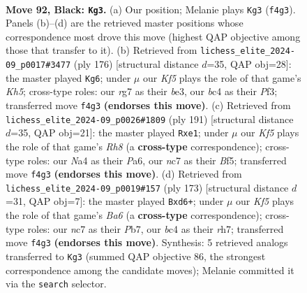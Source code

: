 \documentclass[11pt]{article}
\begin{document}
\clearpage

\begin{figure}[p]\centering
\begin{subfigure}{0.46\textwidth}\centering
\resizebox{\linewidth}{!}{%
\newchessgame
\chessboard[
  setfen={8/2N3R1/8/5P2/npB1bkP1/8/8/5K2 b - - 7 92},
  showmover=false,
  pgfstyle=straightmove, color=movearrow, markmove={f4-g3}
]}
\caption{}
\end{subfigure}\hfill
\begin{subfigure}{0.46\textwidth}\centering
\resizebox{\linewidth}{!}{%
\newchessgame
\chessboard[
  setfen={2B5/8/3kp2p/5p1K/8/4bP2/8/8 w - - 3 89},
  showmover=false,
  pgfstyle=straightmove, color=movearrow, markmove={h5-g6}
]}
\caption{}
\end{subfigure}
\\[4pt]
\begin{subfigure}{0.46\textwidth}\centering
\resizebox{\linewidth}{!}{%
\newchessgame
\chessboard[
  setfen={6R1/8/p4b2/3k1b2/p7/2P2K2/1P6/4B2r b - - 0 96},
  showmover=false,
  pgfstyle=straightmove, color=movearrow, markmove={h1-e1}
]}
\caption{}
\end{subfigure}\hfill
\begin{subfigure}{0.46\textwidth}\centering
\resizebox{\linewidth}{!}{%
\newchessgame
\chessboard[
  setfen={R7/1pK4R/3P4/P3r3/2k5/b7/8/8 b - - 3 87},
  showmover=false,
  pgfstyle=straightmove, color=movearrow, markmove={a3-d6}
]}
\caption{}
\end{subfigure}
\caption{\textbf{Move 92, Black: \texttt{Kg3}.} (a) Our position; Melanie plays \texttt{Kg3} (\texttt{f4g3}). Panels (b)--(d) are the retrieved master positions whose correspondence most drove this move (highest QAP objective among those that transfer to it). (b) Retrieved from \texttt{lichess\_elite\_2024-09\_p0017\#3477} (ply 176) [structural distance $d$=35, QAP obj=28]: the master played \texttt{Kg6}; under $\mu$ our \emph{Kf5} plays the role of that game's \emph{Kh5}; cross-type roles: our \emph{r}g7 as their \emph{b}e3, our \emph{b}c4 as their \emph{P}f3; transferred move \texttt{f4g3} \textbf{(endorses this move)}. (c) Retrieved from \texttt{lichess\_elite\_2024-09\_p0026\#1809} (ply 191) [structural distance $d$=35, QAP obj=21]: the master played \texttt{Rxe1}; under $\mu$ our \emph{Kf5} plays the role of that game's \emph{Rh8} (a \textbf{cross-type} correspondence); cross-type roles: our \emph{N}a4 as their \emph{P}a6, our \emph{n}c7 as their \emph{B}f5; transferred move \texttt{f4g3} \textbf{(endorses this move)}. (d) Retrieved from \texttt{lichess\_elite\_2024-09\_p0019\#157} (ply 173) [structural distance $d$=31, QAP obj=7]: the master played \texttt{Bxd6+}; under $\mu$ our \emph{Kf5} plays the role of that game's \emph{Ba6} (a \textbf{cross-type} correspondence); cross-type roles: our \emph{n}c7 as their \emph{P}b7, our \emph{b}c4 as their \emph{r}h7; transferred move \texttt{f4g3} \textbf{(endorses this move)}. Synthesis: 5 retrieved analogs transferred to \texttt{Kg3} (summed QAP objective 86, the strongest correspondence among the candidate moves); Melanie committed it via the \texttt{search} selector.}
\label{fig:thought-m183}
\end{figure}
\end{document}
